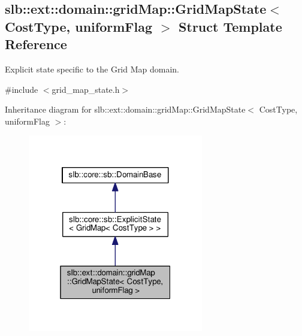\hypertarget{structslb_1_1ext_1_1domain_1_1gridMap_1_1GridMapState}{}\subsection{slb\+:\+:ext\+:\+:domain\+:\+:grid\+Map\+:\+:Grid\+Map\+State$<$ Cost\+Type, uniform\+Flag $>$ Struct Template Reference}
\label{structslb_1_1ext_1_1domain_1_1gridMap_1_1GridMapState}


Explicit state specific to the Grid Map domain.  




{\ttfamily \#include $<$grid\+\_\+map\+\_\+state.\+h$>$}



Inheritance diagram for slb\+:\+:ext\+:\+:domain\+:\+:grid\+Map\+:\+:Grid\+Map\+State$<$ Cost\+Type, uniform\+Flag $>$\+:\nopagebreak
\begin{figure}[H]
\begin{center}
\leavevmode
\includegraphics[width=217pt]{structslb_1_1ext_1_1domain_1_1gridMap_1_1GridMapState__inherit__graph}
\end{center}
\end{figure}


